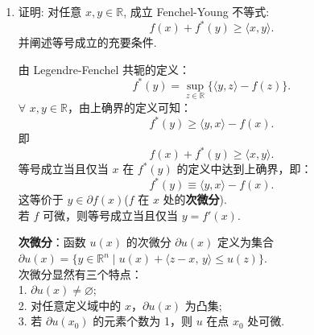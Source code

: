 \begin{enumerate}
    \item[1.]证明: 对任意 \(\displaystyle x,y \in \mathbb{R}\), 成立 Fenchel-Young 不等式:
    \[\displaystyle f(x) + f^{*}(y) \geq \langle x,y \rangle .\]
    并阐述等号成立的充要条件.
    \begin{solution}
        由 Legendre-Fenchel 共轭的定义：
        \[
        f^*(y) = \sup_{z \in \mathbb{R}} \{ \langle y, z \rangle - f(z) \}.
        \]
        $\forall$ \( x , y\in\mathbb{R} \)，由上确界的定义可知：
        \[
        f^*(y) \geq \langle y, x \rangle - f(x).
        \]
        即
        \[
        f(x) + f^*(y) \geq \langle x, y \rangle.
        \]
        等号成立当且仅当 \( x \) 在 \( f^*(y) \) 的定义中达到上确界，即：
        \[
        f^*(y) \equiv \langle y, x \rangle - f(x).
        \]
        这等价于 \( y \in \partial f(x) \)(\( f \) 在 \( x \) 处的\textbf{次微分}).\\
        若 \( f \) 可微，则等号成立当且仅当 \( y = f'(x) \).

        \textbf{次微分}：函数 $u(x)$ 的次微分 $\partial u(x)$ 定义为集合 $\partial u(x)=\{y\in\mathbb{R}^n\mid u(x)+\langle z-x,\,y \rangle\leq u(z)\}$.\\ 
        次微分显然有三个特点：\\
        1. $\partial u(x)\neq \varnothing$; \\
        2. 对任意定义域中的 $x$，$\partial u(x)$ 为凸集; \\
        3. 若 $\partial u(x_0)$ 的元素个数为 1，则 $u$ 在点 $x_0$ 处可微.
    \end{solution}


\end{enumerate}
